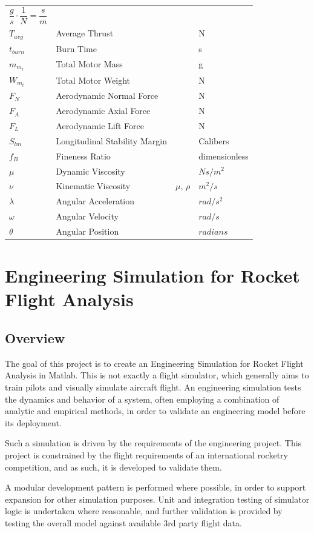 \documentclass[]{book}
\begin{document}
\begin{longtable}[c]{@{}llll@{}}
\(\dfrac{g}{s}\cdot \dfrac{1}{N} = \dfrac{s}{m}\)\tabularnewline
\(T_{avg}\) & Average Thrust & & N\tabularnewline
\(t_{burn}\) & Burn Time & & s\tabularnewline
\(m_{m_t}\) & Total Motor Mass & & g\tabularnewline
\(W_{m_t}\) & Total Motor Weight & & N\tabularnewline
\(F_N\) & Aerodynamic Normal Force & & N\tabularnewline
\(F_A\) & Aerodynamic Axial Force & & N\tabularnewline
\(F_L\) & Aerodynamic Lift Force & & N\tabularnewline
\(S_{lm}\) & Longitudinal Stability Margin & & Calibers\tabularnewline
\(f_B\) & Fineness Ratio & & dimensionless\tabularnewline
\(\mu\) & Dynamic Viscosity & & \(N s / m^2\)\tabularnewline
\(\nu\) & Kinematic Viscosity & \(\mu\), \(\rho\) &
\(m^2/s\)\tabularnewline
\(\lambda\) & Angular Acceleration & & \(rad/s^2\)\tabularnewline
\(\omega\) & Angular Velocity & & \(rad/s\)\tabularnewline
\(\theta\) & Angular Position & & \(radians\)\tabularnewline
\bottomrule
\end{longtable}


\clearpage

\mainmatter

\chapter{Engineering Simulation for Rocket Flight
Analysis}\label{engineering-simulation-for-rocket-flight-analysis}

\section{Overview}\label{overview}

The goal of this project is to create an Engineering Simulation for
Rocket Flight Analysis in Matlab. This is not exactly a flight
simulator, which generally aims to train pilots and visually simulate
aircraft flight. An engineering simulation tests the dynamics and
behavior of a system, often employing a combination of analytic and
empirical methods, in order to validate an engineering model before its
deployment.

Such a simulation is driven by the requirements of the engineering
project. This project is constrained by the flight requirements of an
international rocketry competition, and as such, it is developed to
validate them.

A modular development pattern is performed where possible, in order to
support expansion for other simulation purposes. Unit and integration
testing of simulator logic is undertaken where reasonable, and further
validation is provided by testing the overall model against available
3rd party flight data.
\end{document}
